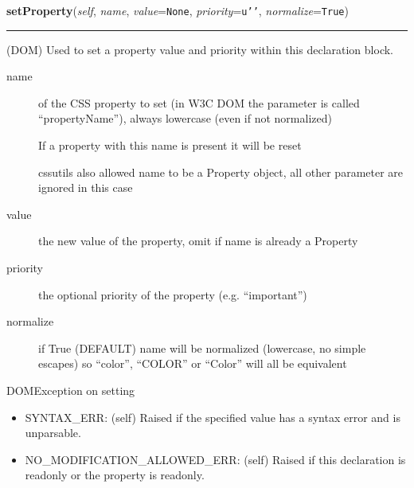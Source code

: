     \vspace{0.5ex}

\hspace{.8\funcindent}\begin{boxedminipage}{\funcwidth}

    \raggedright \textbf{setProperty}(\textit{self}, \textit{name}, \textit{value}={\tt None}, \textit{priority}={\tt \texttt{u'}\texttt{}\texttt{'}}, \textit{normalize}={\tt True})

    \vspace{-1.5ex}

    \rule{\textwidth}{0.5\fboxrule}
\setlength{\parskip}{2ex}

(DOM)
Used to set a property value and priority within this declaration
block.
\begin{description}
\item[{name}] \leavevmode 
of the CSS property to set (in W3C DOM the parameter is called
``propertyName''), always lowercase (even if not normalized)

If a property with this name is present it will be reset

cssutils also allowed name to be a Property object, all other
parameter are ignored in this case

\item[{value}] \leavevmode 
the new value of the property, omit if name is already a Property

\item[{priority}] \leavevmode 
the optional priority of the property (e.g. ``important'')

\item[{normalize}] \leavevmode 
if True (DEFAULT) name will be normalized (lowercase, no simple
escapes) so ``color'', ``COLOR'' or ``Color'' will all be equivalent

\end{description}

DOMException on setting
\begin{itemize}
\item {} 
SYNTAX{\_}ERR: (self)
Raised if the specified value has a syntax error and is
unparsable.

\item {} 
NO{\_}MODIFICATION{\_}ALLOWED{\_}ERR: (self)
Raised if this declaration is readonly or the property is
readonly.

\end{itemize}
\setlength{\parskip}{1ex}
    \end{boxedminipage}

